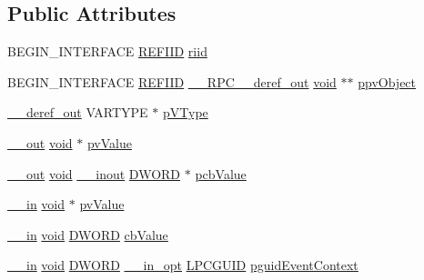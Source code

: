 \subsection*{Public Attributes}
\begin{DoxyCompactItemize}
\item 
B\+E\+G\+I\+N\+\_\+\+I\+N\+T\+E\+R\+F\+A\+CE \hyperlink{px__win__ds_8c_a80ec49c8ae61e234197d5071d2df497d}{R\+E\+F\+I\+ID} \hyperlink{struct_i_device_specific_property_vtbl_a77f8414fc5b90461ce21531b070f0298}{riid}
\item 
B\+E\+G\+I\+N\+\_\+\+I\+N\+T\+E\+R\+F\+A\+CE \hyperlink{px__win__ds_8c_a80ec49c8ae61e234197d5071d2df497d}{R\+E\+F\+I\+ID} \hyperlink{rpcsal_8h_a23bc188526f10656f9c79d950f6c3192}{\+\_\+\+\_\+\+R\+P\+C\+\_\+\+\_\+deref\+\_\+out} \hyperlink{sound_8c_ae35f5844602719cf66324f4de2a658b3}{void} $\ast$$\ast$ \hyperlink{struct_i_device_specific_property_vtbl_a8047c290fd471a096e9f2761a630e471}{ppv\+Object}
\item 
\hyperlink{sal_8h_a7dec33add44f7afd0eb61b1249a35298}{\+\_\+\+\_\+deref\+\_\+out} V\+A\+R\+T\+Y\+PE $\ast$ \hyperlink{struct_i_device_specific_property_vtbl_a7b6fd84fe7db8fcb03ad33e2adb25858}{p\+V\+Type}
\item 
\hyperlink{sal_8h_abb4c3c1135aab6c47cff22e7c16efb74}{\+\_\+\+\_\+out} \hyperlink{sound_8c_ae35f5844602719cf66324f4de2a658b3}{void} $\ast$ \hyperlink{struct_i_device_specific_property_vtbl_a9cfd189dbf31ba60b82cc9d3013bb902}{pv\+Value}
\item 
\hyperlink{sal_8h_abb4c3c1135aab6c47cff22e7c16efb74}{\+\_\+\+\_\+out} \hyperlink{sound_8c_ae35f5844602719cf66324f4de2a658b3}{void} \hyperlink{sal_8h_a9a66acb8f87800f41a837406c837cb32}{\+\_\+\+\_\+inout} \hyperlink{mapinls_8h_ad342ac907eb044443153a22f964bf0af}{D\+W\+O\+RD} $\ast$ \hyperlink{struct_i_device_specific_property_vtbl_a08ed5230991ad4cea82caf78997a7432}{pcb\+Value}
\item 
\hyperlink{sal_8h_a3f6b8655e1aa9dfc15a9029f0343009e}{\+\_\+\+\_\+in} \hyperlink{sound_8c_ae35f5844602719cf66324f4de2a658b3}{void} $\ast$ \hyperlink{struct_i_device_specific_property_vtbl_add16e94884aceae7e76b67030179efe0}{pv\+Value}
\item 
\hyperlink{sal_8h_a3f6b8655e1aa9dfc15a9029f0343009e}{\+\_\+\+\_\+in} \hyperlink{sound_8c_ae35f5844602719cf66324f4de2a658b3}{void} \hyperlink{mapinls_8h_ad342ac907eb044443153a22f964bf0af}{D\+W\+O\+RD} \hyperlink{struct_i_device_specific_property_vtbl_a374fa73371305bbad05f7375c7dc5ad8}{cb\+Value}
\item 
\hyperlink{sal_8h_a3f6b8655e1aa9dfc15a9029f0343009e}{\+\_\+\+\_\+in} \hyperlink{sound_8c_ae35f5844602719cf66324f4de2a658b3}{void} \hyperlink{mapinls_8h_ad342ac907eb044443153a22f964bf0af}{D\+W\+O\+RD} \hyperlink{sal_8h_a9c2d0f2980e51b51bb405ee2a31a3353}{\+\_\+\+\_\+in\+\_\+opt} \hyperlink{pa__win__wasapi_8c_a9c061ab1f26db8746b3dab38991f48a0}{L\+P\+C\+G\+U\+ID} \hyperlink{struct_i_device_specific_property_vtbl_a06fd13e918cf7dcb5c86112bcb3def73}{pguid\+Event\+Context}
$$
\end{DoxyCompactItemize}
